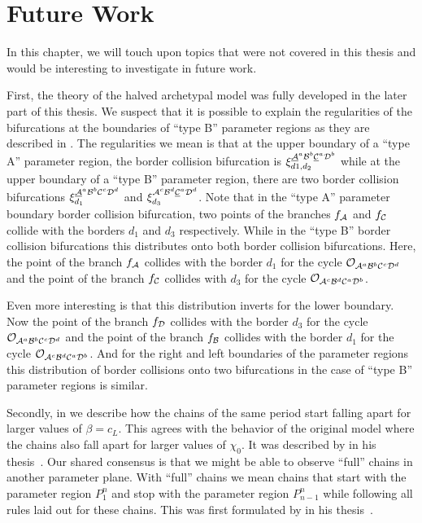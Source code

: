\chapter{Future Work}
\label{chap:outlook}

In this chapter, we will touch upon topics that were not covered in this thesis and would be interesting to investigate in future work.

First, the theory of the halved archetypal model was fully developed in the later part of this thesis.
We suspect that it is possible to explain the regularities of the bifurcations at the boundaries of ``type B'' parameter regions as they are described in .
The regularities we mean is that at the upper boundary of a ``type A'' parameter region, the border collision bifurcation is $\xi_{d1, d_2}^{\underline{\mathcal{A}}^a\mathcal{B}^b\underline{\mathcal{C}}^a\mathcal{D}^b}$ while at the upper boundary of a ``type B'' parameter region, there are two border collision bifurcations $\xi_{d_1}^{\underline{\mathcal{A}}^a\mathcal{B}^b\mathcal{C}^c\mathcal{D}^d}$ and $\xi_{d_3}^{\mathcal{A}^c\mathcal{B}^d\underline{\mathcal{C}}^a\mathcal{D}^d}$.
Note that in the ``type A'' parameter boundary border collision bifurcation, two points of the branches $f_{\mathcal{A}}$ and $f_{\mathcal{C}}$ collide with the borders $d_1$ and $d_3$ respectively.
While in the ``type B'' border collision bifurcations this distributes onto both border collision bifurcations.
Here, the point of the branch $f_{\mathcal{A}}$ collides with the border $d_1$ for the cycle $\mathcal{O}_{\mathcal{A}^a\mathcal{B}^b\mathcal{C}^c\mathcal{D}^d}$ and the point of the branch $f_{\mathcal{C}}$ collides with $d_3$ for the cycle $\mathcal{O}_{\mathcal{A}^c\mathcal{B}^d\mathcal{C}^a\mathcal{D}^b}$.

Even more interesting is that this distribution inverts for the lower boundary.
Now the point of the branch $f_{\mathcal{D}}$ collides with the border $d_3$ for the cycle $\mathcal{O}_{\mathcal{A}^a\mathcal{B}^b\mathcal{C}^c\mathcal{D}^d}$ and the point of the branch $f_{\mathcal{B}}$ collides with the border $d_1$ for the cycle $\mathcal{O}_{\mathcal{A}^c\mathcal{B}^d\mathcal{C}^a\mathcal{D}^b}$.
And for the right and left boundaries of the parameter regions this distribution of border collisions onto two bifurcations in the case of ``type B'' parameter regions is similar.

Secondly, in  we describe how the chains of the same period start falling apart for larger values of $\beta = c_L$.
This agrees with the behavior of the original model where the chains also fall apart for larger values of $\chi_0$.
It was described by  in his thesis~\cite{akyuz2022}.
Our shared consensus is that we might be able to observe ``full'' chains in another parameter plane.
With ``full'' chains we mean chains that start with the parameter region $P^{n}_{1}$ and stop with the parameter region $P^{n}_{n-1}$ while following all rules laid out for these chains.
This was first formulated by  in his thesis~\cite{akyuz2022}.

